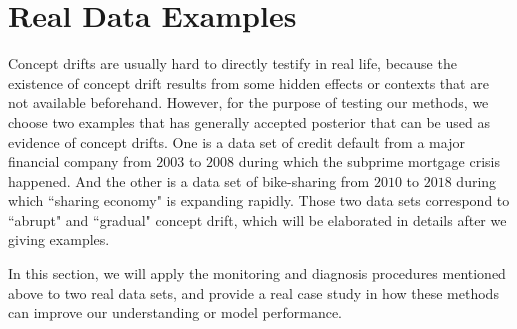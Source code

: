 \documentclass[twoside,11pt]{article}
\begin{document}
\section{Real Data Examples}
Concept drifts are usually hard to directly testify in real life, because the existence of concept drift results from some hidden effects or contexts that are not available beforehand. However, for the purpose of testing our methods, we choose two examples that has generally accepted posterior that can be used as evidence of concept drifts. One is a data set of credit default from a major financial company from $2003$ to $2008$ during which the subprime mortgage crisis happened. And the other is a data set of bike-sharing from $2010$ to $2018$ during which ``sharing economy" is expanding rapidly. Those two data sets correspond to ``abrupt" and ``gradual" concept drift, which will be elaborated in details after we giving examples.

In this section, we will apply the monitoring and diagnosis procedures mentioned above to two real data sets, and provide a real case study in how these methods can improve our understanding or model performance.
\end{document}
